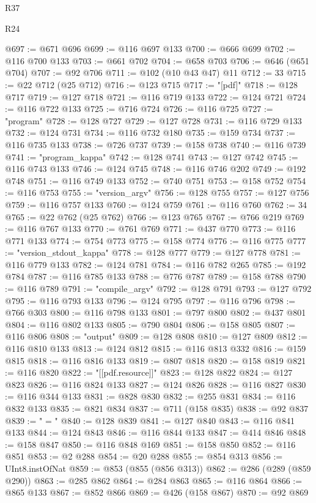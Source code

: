 \begin{lexlean}{R37}
\begin{lexlean}{R24}
\begin{coremodule}
{{{{{{{{{{{{{{{{{{{{{{{{{{{{{{{{{{{{{{{{{{{{{{{{{{{{{{{{{{{{{{{{{{{{{{{{{{{{{{{{{{{{{{{{{{{{{{{{{{{{{{{{{{{{{{{{{{{{{{{{{{{{{{{{{{{{{{{{{{{{{{{{{{{{{{{{{{{{{{{{{{{{{{{{{{{{{{{{{{{{{{{{{@697 := @671 @696
@699 := @116 @697 @133
@700 := @666 @699
@702 := @116 @700 @133
@703 := @661 @702
@704 := @658 @703
@706 := @646 (@651 @704)
@707 := @92 @706
@711 := @102 (@10 @43 @47) @11
@712 := 33
@715 := @22 @712 (@25 @712)
@716 := @123 @715
@717 := "[pdf]"
@718 := @128 @717
@719 := @127 @718
@721 := @116 @719 @133
@722 := @124 @721
@724 := @116 @722 @133
@725 := @716 @724
@726 := @116 @725
@727 := "program"
@728 := @128 @727
@729 := @127 @728
@731 := @116 @729 @133
@732 := @124 @731
@734 := @116 @732 @180
@735 := @159 @734
@737 := @116 @735 @133
@738 := @726 @737
@739 := @158 @738
@740 := @116 @739
@741 := "program_kappa"
@742 := @128 @741
@743 := @127 @742
@745 := @116 @743 @133
@746 := @124 @745
@748 := @116 @746 @202
@749 := @192 @748
@751 := @116 @749 @133
@752 := @740 @751
@753 := @158 @752
@754 := @116 @753
@755 := "version_argv"
@756 := @128 @755
@757 := @127 @756
@759 := @116 @757 @133
@760 := @124 @759
@761 := @116 @760
@762 := 34
@765 := @22 @762 (@25 @762)
@766 := @123 @765
@767 := @766 @219
@769 := @116 @767 @133
@770 := @761 @769
@771 := @437 @770
@773 := @116 @771 @133
@774 := @754 @773
@775 := @158 @774
@776 := @116 @775
@777 := "version_stdout_kappa"
@778 := @128 @777
@779 := @127 @778
@781 := @116 @779 @133
@782 := @124 @781
@784 := @116 @782 @265
@785 := @192 @784
@787 := @116 @785 @133
@788 := @776 @787
@789 := @158 @788
@790 := @116 @789
@791 := "compile_argv"
@792 := @128 @791
@793 := @127 @792
@795 := @116 @793 @133
@796 := @124 @795
@797 := @116 @796
@798 := @766 @303
@800 := @116 @798 @133
@801 := @797 @800
@802 := @437 @801
@804 := @116 @802 @133
@805 := @790 @804
@806 := @158 @805
@807 := @116 @806
@808 := "output"
@809 := @128 @808
@810 := @127 @809
@812 := @116 @810 @133
@813 := @124 @812
@815 := @116 @813 @332
@816 := @159 @815
@818 := @116 @816 @133
@819 := @807 @818
@820 := @158 @819
@821 := @116 @820
@822 := "[[pdf.resource]]"
@823 := @128 @822
@824 := @127 @823
@826 := @116 @824 @133
@827 := @124 @826
@828 := @116 @827
@830 := @116 @344 @133
@831 := @828 @830
@832 := @255 @831
@834 := @116 @832 @133
@835 := @821 @834
@837 := @711 (@158 @835)
@838 := @92 @837
@839 := " = "
@840 := @128 @839
@841 := @127 @840
@843 := @116 @841 @133
@844 := @124 @843
@846 := @116 @844 @133
@847 := @414 @846
@848 := @158 @847
@850 := @116 @848 @169
@851 := @158 @850
@852 := @116 @851
@853 := @2 @288
@854 := @20 @288
@855 := @854 @313
@856 := UInt8.instOfNat
@859 := @853 (@855 (@856 @313))
@862 := @286 (@289 (@859 @290))
@863 := @285 @862
@864 := @284 @863
@865 := @116 @864
@866 := @865 @133
@867 := @852 @866
@869 := @426 (@158 @867)
@870 := @92 @869
}}}}}}}}}}}}}}}}}}}}}}}}}}}}}}}}}}}}}}}}}}}}}}}}}}}}}}}}}}}}}}}}}}}}}}}}}}}}}}}}}}}}}}}}}}}}}}}}}}}}}}}}}}}}}}}}}}}}}}}}}}}}}}}}}}}}}}}}}}}}}}}}}}}}}}}}}}}}}}}}}}}}}}}}}}}}}}}}}}}}}}}}}
\end{coremodule}
\end{lexlean}
\end{lexlean}
